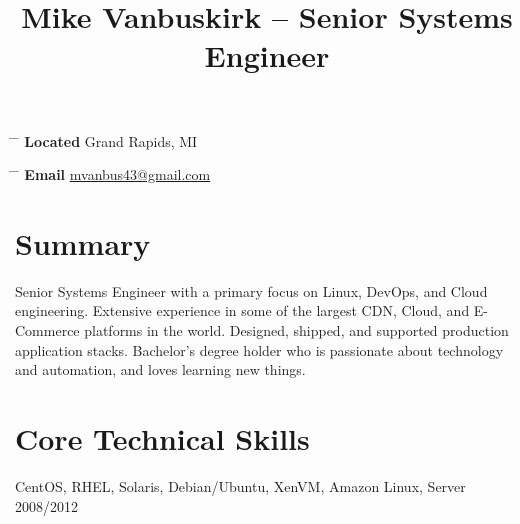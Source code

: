 \documentclass[10pt]{article} %
\begin{document}

\title{Mike Vanbuskirk -- Senior Systems Engineer} %


\parbox{0.5\textwidth}{ %
\begin{tabbing} %
\hspace{3cm} \= \hspace{4cm} \= \kill %
{\bf Located} \> Grand Rapids, MI\\ %
\end{tabbing}}
\hfill %
\parbox{0.5\textwidth}{ %
\begin{tabbing} %
\hspace{3cm} \= \hspace{4cm} \= \kill %
{\bf Email} \> \href{mailto:mvanbus43@gmail.com}{mvanbus43@gmail.com} \\ %
\end{tabbing}}


\section{Summary}
  Senior Systems Engineer with a primary focus on Linux, DevOps, and Cloud engineering. Extensive experience in some of the largest CDN, Cloud, and E-Commerce platforms in the world. Designed, shipped, and supported production application stacks. Bachelor's degree holder who is passionate about technology and automation, and loves learning new things.

\section{Core Technical Skills}

{
CentOS, RHEL, Solaris, Debian/Ubuntu, XenVM, Amazon Linux, Server 2008/2012
}
\end{document}
